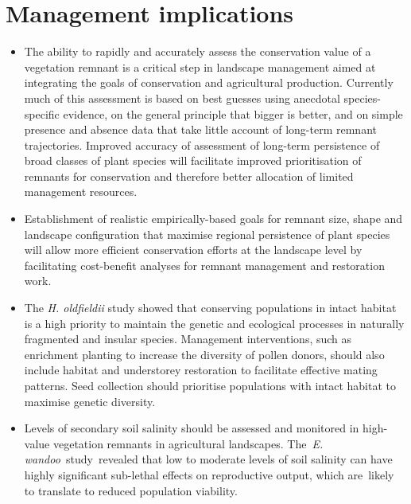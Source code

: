 \documentclass[version=last,
    paper=a4, %
    10pt, %
    usenames,
    dvipsnames,
    oneside, %
    headings=openany, %
    DIV=15 %
]{scrbook}
\begin{document}
\section*{Management implications}
\begin{itemize}
\itemsep1pt\parskip0pt
\item
  The ability to rapidly and accurately assess the conservation value of
  a vegetation remnant is a critical step in landscape management aimed
  at integrating the goals of conservation and agricultural production.
  Currently much of this assessment is based on best guesses using
  anecdotal species-specific evidence, on the general principle that
  bigger is better, and on simple presence and absence data that take
  little account of long-term remnant trajectories. Improved accuracy of
  assessment of long-term persistence of broad classes of plant species
  will facilitate improved prioritisation of remnants for conservation
  and therefore better allocation of limited management resources.
\item
  Establishment of realistic empirically-based goals for remnant size,
  shape and landscape configuration that maximise regional persistence
  of plant species will allow more efficient conservation efforts at the
  landscape level by facilitating cost-benefit analyses for remnant
  management and restoration work.
\item
  The \emph{H. oldfieldii} study showed that conserving populations in
  intact habitat is a high priority to maintain the genetic and
  ecological processes in naturally fragmented and insular species.
  Management interventions, such as enrichment planting to increase the
  diversity of pollen donors, should also include habitat and
  understorey restoration to facilitate effective mating patterns. Seed
  collection should prioritise populations with intact habitat to
  maximise genetic diversity.
\item
  Levels of secondary soil salinity should be assessed and monitored in
  high-value vegetation remnants in agricultural landscapes.
  The~\emph{E. wandoo~}study~revealed that low to moderate levels of
  soil salinity can have highly significant sub-lethal effects on
  reproductive output, which are~likely to translate to reduced
  population viability.
\end{itemize}
\end{document}

